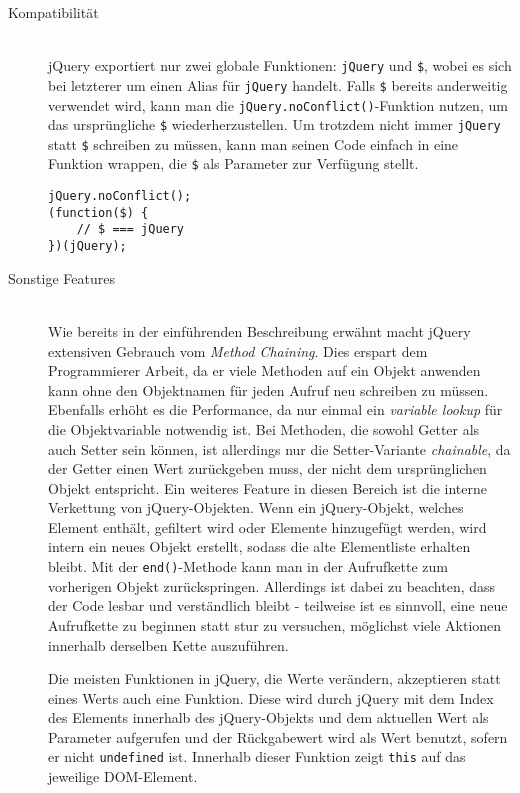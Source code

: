 \begin{description}
\item[Kompatibilität] \hfill \\
jQuery exportiert nur zwei globale Funktionen: \lstinline{jQuery} und \lstinline{$}, wobei es
sich bei letzterer um einen Alias für \lstinline{jQuery} handelt. Falls \lstinline{$} bereits
anderweitig verwendet wird, kann man die \lstinline{jQuery.noConflict()}-Funktion nutzen, um das
ursprüngliche \lstinline{$} wiederherzustellen. Um trotzdem nicht immer \lstinline{jQuery} statt
\lstinline{$} schreiben zu müssen, kann man seinen Code einfach in eine Funktion wrappen, die
\lstinline{$} als Parameter zur Verfügung stellt.
\begin{lstlisting}[caption=Verwendung von \$.noConflict]
jQuery.noConflict();
(function($) {
    // $ === jQuery
})(jQuery);
\end{lstlisting}

\item[Sonstige Features] \hfill \\
Wie bereits in der einführenden Beschreibung erwähnt macht jQuery extensiven Gebrauch vom
\emph{Method Chaining}. Dies erspart dem Programmierer Arbeit, da er viele Methoden auf ein Objekt
anwenden kann ohne den Objektnamen für jeden Aufruf neu schreiben zu müssen. Ebenfalls erhöht es die
Performance, da nur einmal ein \emph{variable lookup} für die Objektvariable notwendig ist. Bei
Methoden, die sowohl Getter als auch Setter sein können, ist allerdings nur die Setter-Variante
\emph{chainable}, da der Getter einen Wert zurückgeben muss, der nicht dem ursprünglichen Objekt
entspricht. Ein weiteres Feature in diesen Bereich ist die interne Verkettung von jQuery-Objekten.
Wenn ein jQuery-Objekt, welches Element enthält, gefiltert wird oder Elemente hinzugefügt werden,
wird intern ein neues Objekt erstellt, sodass die alte Elementliste erhalten bleibt. Mit der
\lstinline{end()}-Methode kann man in der Aufrufkette zum vorherigen Objekt zurückspringen.
Allerdings ist dabei zu beachten, dass der Code lesbar und verständlich bleibt - teilweise ist es
sinnvoll, eine neue Aufrufkette zu beginnen statt stur zu versuchen, möglichst viele Aktionen
innerhalb derselben Kette auszuführen.

Die meisten Funktionen in jQuery, die Werte verändern, akzeptieren statt eines Werts auch eine
Funktion. Diese wird durch jQuery mit dem Index des Elements innerhalb des jQuery-Objekts und dem
aktuellen Wert als Parameter aufgerufen und der Rückgabewert wird als Wert benutzt, sofern er nicht
\lstinline{undefined} ist. Innerhalb dieser Funktion zeigt \lstinline{this} auf das jeweilige
DOM-Element.


\end{description}
